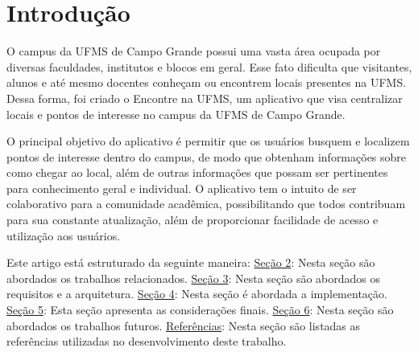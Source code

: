 \section{Introdução}
O campus da UFMS de Campo Grande possui uma vasta área ocupada por diversas faculdades, institutos e blocos em geral. Esse fato dificulta que visitantes, alunos e até mesmo docentes conheçam ou encontrem locais presentes na UFMS. Dessa forma, foi criado o Encontre na UFMS, um aplicativo que visa centralizar locais e pontos de interesse no campus da UFMS de Campo Grande.

O principal objetivo do aplicativo é permitir que os usuários busquem e localizem pontos de interesse dentro do campus, de modo que obtenham informações sobre como chegar ao local, além de outras informações que possam ser pertinentes para conhecimento geral e individual. O aplicativo tem o intuito de ser colaborativo para a comunidade acadêmica, possibilitando que todos contribuam para sua constante atualização, além de proporcionar facilidade de acesso e utilização aos usuários.

Este artigo está estruturado da seguinte maneira: \hyperref[sec:trabalhos_relacionados]{Seção 2}: Nesta seção são abordados os trabalhos relacionados. \hyperref[sec:arquitetura]{Seção 3}: Nesta seção são abordados os requisitos e a arquitetura. \hyperref[sec:implementacao]{Seção 4}: Nesta seção é abordada a implementação. \hyperref[sec:consideracoes_finais]{Seção 5}: Esta seção apresenta as considerações finais. \hyperref[sec:trabalhos_futuros]{Seção 6}: Nesta seção são abordados os trabalhos futuros. \hyperref[sec:referencias]{Referências}: Nesta seção são listadas as referências utilizadas no desenvolvimento deste trabalho.